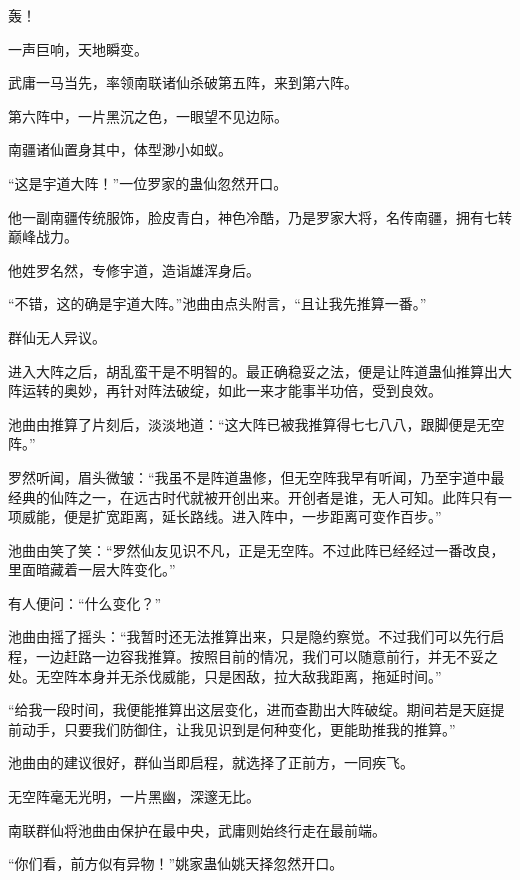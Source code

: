 
\begin{this_body}



轰！

一声巨响，天地瞬变。

武庸一马当先，率领南联诸仙杀破第五阵，来到第六阵。

第六阵中，一片黑沉之色，一眼望不见边际。

南疆诸仙置身其中，体型渺小如蚁。

“这是宇道大阵！”一位罗家的蛊仙忽然开口。

他一副南疆传统服饰，脸皮青白，神色冷酷，乃是罗家大将，名传南疆，拥有七转巅峰战力。

他姓罗名然，专修宇道，造诣雄浑身后。

“不错，这的确是宇道大阵。”池曲由点头附言，“且让我先推算一番。”

群仙无人异议。

进入大阵之后，胡乱蛮干是不明智的。最正确稳妥之法，便是让阵道蛊仙推算出大阵运转的奥妙，再针对阵法破绽，如此一来才能事半功倍，受到良效。

池曲由推算了片刻后，淡淡地道：“这大阵已被我推算得七七八八，跟脚便是无空阵。”

罗然听闻，眉头微皱：“我虽不是阵道蛊修，但无空阵我早有听闻，乃至宇道中最经典的仙阵之一，在远古时代就被开创出来。开创者是谁，无人可知。此阵只有一项威能，便是扩宽距离，延长路线。进入阵中，一步距离可变作百步。”

池曲由笑了笑：“罗然仙友见识不凡，正是无空阵。不过此阵已经经过一番改良，里面暗藏着一层大阵变化。”

有人便问：“什么变化？”

池曲由摇了摇头：“我暂时还无法推算出来，只是隐约察觉。不过我们可以先行启程，一边赶路一边容我推算。按照目前的情况，我们可以随意前行，并无不妥之处。无空阵本身并无杀伐威能，只是困敌，拉大敌我距离，拖延时间。”

“给我一段时间，我便能推算出这层变化，进而查勘出大阵破绽。期间若是天庭提前动手，只要我们防御住，让我见识到是何种变化，更能助推我的推算。”

池曲由的建议很好，群仙当即启程，就选择了正前方，一同疾飞。

无空阵毫无光明，一片黑幽，深邃无比。

南联群仙将池曲由保护在最中央，武庸则始终行走在最前端。

“你们看，前方似有异物！”姚家蛊仙姚天择忽然开口。


\end{this_body}
